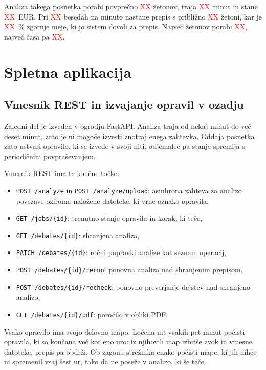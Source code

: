 \documentclass[a4paper, 12pt]{book}
\begin{document}
Analiza takega posnetka porabi povprečno \textcolor{red}{XX} žetonov, traja \textcolor{red}{XX} minut in stane \textcolor{red}{XX}~EUR. Pri \textcolor{red}{XX} besedah na minuto nastane prepis s približno
\textcolor{red}{XX} žetoni, kar je \textcolor{red}{XX}~\% zgornje meje, ki jo
sistem dovoli za prepis. Največ žetonov porabi \textcolor{red}{XX}, največ časa
pa \textcolor{red}{XX}.


\section{Spletna aplikacija}
\label{sec:aplikacija}

\subsection{Vmesnik REST in izvajanje opravil v ozadju}
\label{ssec:backend}

Zaledni del je izveden v ogrodju FastAPI.
Analiza traja od nekaj minut do več deset minut, zato je ni mogoče izvesti znotraj enega zahtevka.
Oddaja posnetka zato ustvari opravilo, ki se izvede v svoji niti, odjemalec pa stanje spremlja s periodičnim povpraševanjem.

Vmesnik REST ima te končne točke:
\begin{itemize}
\item \texttt{POST /analyze} in \texttt{POST /analyze/upload}: asinhrona zahteva za analizo povezave oziroma naložene datoteke, ki vrne oznako opravila,
\item \texttt{GET /jobs/\{id\}}: trenutno stanje opravila in korak, ki teče,
\item \texttt{GET /debates/\{id\}}: shranjena analiza,
\item \texttt{PATCH /debates/\{id\}}: ročni popravki analize kot seznam operacij,
\item \texttt{POST /debates/\{id\}/rerun}: ponovna analiza nad shranjenim prepisom,
\item \texttt{POST /debates/\{id\}/recheck}: ponovno preverjanje dejstev nad shranjeno analizo,
\item \texttt{GET /debates/\{id\}/pdf}: poročilo v obliki PDF.
\end{itemize}

Vsako opravilo ima svojo delovno mapo. Ločena nit vsakih pet minut počisti opravila, ki so končana več kot eno uro: iz njihovih map izbriše zvok in vmesne datoteke, prepis pa obdrži. Ob zagonu strežnika enako počisti mape, ki jih nihče ni spremenil vsaj šest ur, tako da ne poseže v analizo, ki še teče.
\end{document}
